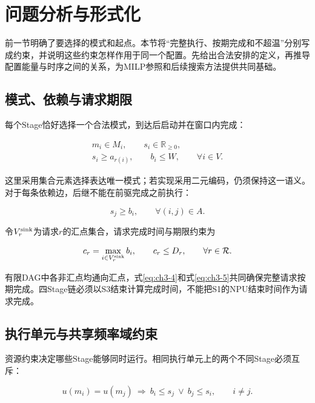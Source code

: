 \section{问题分析与形式化}

前一节明确了要选择的模式和起点。本节将“完整执行、按期完成和不超温”分别写成约束，并说明这些约束怎样作用于同一个配置。先给出合法安排的定义，再推导配置能量与时序之间的关系，为MILP参照和后续搜索方法提供共同基础。


\subsection{模式、依赖与请求期限}

每个Stage恰好选择一个合法模式，到达后启动并在窗口内完成：

\begin{equation}
\begin{gathered}
m_i\in M_i,\qquad s_i\in\mathbb R_{\ge0},\\
s_i\ge a_{r(i)},\qquad b_i\le W,\qquad \forall i\in V.
\end{gathered}
\label{eq:ch3-3}
\end{equation}

这里采用集合元素选择表达唯一模式；若实现采用二元编码，仍须保持这一语义。对于每条依赖边，后继不能在前驱完成之前执行：

\begin{equation}
s_j\ge b_i,\qquad \forall(i,j)\in A.
\label{eq:ch3-4}
\end{equation}

令\(V_r^{\rm sink}\)为请求\(r\)的汇点集合，请求完成时间与期限约束为

\begin{equation}
c_r=\max_{i\in V_r^{\rm sink}} b_i,\qquad c_r\le D_r,\qquad\forall r\in\mathcal R.
\label{eq:ch3-5}
\end{equation}

有限DAG中各非汇点均通向汇点，式\eqref{eq:ch3-4}和式\eqref{eq:ch3-5}共同确保完整请求按期完成。四Stage链必须以S3结束计算完成时间，不能把S1的NPU结束时间作为请求完成。

\subsection{执行单元与共享频率域约束}

资源约束决定哪些Stage能够同时运行。相同执行单元上的两个不同Stage必须互斥：

\begin{equation}
u(m_i)=u(m_j)\ \Longrightarrow\ b_i\le s_j\ \lor\ b_j\le s_i,\qquad i\ne j.
\label{eq:ch3-6}
\end{equation}

